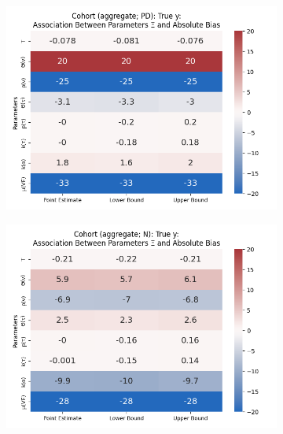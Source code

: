 \documentclass[12pt]{article}
\begin{document}
\begin{figure}[H]
\begin{subfigure}[t]{0.23\linewidth}
		\includegraphics[scale=0.25]{VEMethod_Drivers1b_FEest_Li_MSpec_Heatmap3.png}
	\end{subfigure}
	\begin{subfigure}[t]{0.23\linewidth}
		\centering
		\caption{}
		\includegraphics[scale=0.25]{VEMethod_Drivers1b_FEest_Li_MSpec_Heatmap4.png}
	\end{subfigure}


\end{figure}
\end{document}
